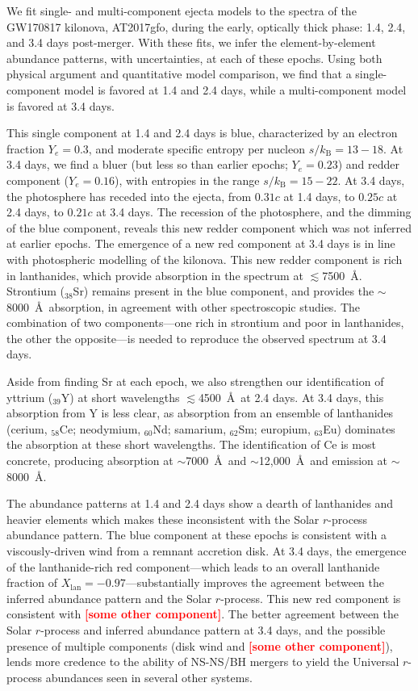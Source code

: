 \documentclass[twocolumn,twocolappendix]{aastex63}
\newcommand\redbf[1]{\textbf{\textcolor{red}{#1}}}
\begin{document}
We fit single- and multi-component ejecta models to the spectra of the GW170817 kilonova, AT2017gfo, during the early, optically thick phase: 1.4, 2.4, and 3.4 days post-merger. With these fits, we infer the element-by-element abundance patterns, with uncertainties, at each of these epochs. Using both physical argument and quantitative model comparison, we find that a single-component model is favored at 1.4 and 2.4 days, while a multi-component model is favored at 3.4 days. 

This single component at 1.4 and 2.4 days is blue, characterized by an electron fraction $Y_e = 0.3$, and moderate specific entropy per nucleon $s / k_{\mathrm{B}} = 13 - 18$. At 3.4 days, we find a bluer (but less so than earlier epochs; $Y_e = 0.23$) and redder component ($Y_e = 0.16$), with entropies in the range $s / k_{\mathrm{B}} = 15 - 22$. At 3.4 days, the photosphere has receded into the ejecta, from $0.31c$ at 1.4 days, to $0.25c$ at 2.4 days, to $0.21c$ at 3.4 days. The recession of the photosphere, and the dimming of the blue component, reveals this new redder component which was not inferred at earlier epochs. The emergence of a new red component at 3.4 days is in line with photospheric modelling of the kilonova. This new redder component is rich in lanthanides, which provide absorption in the spectrum at $\lesssim$7500~\AA. Strontium (${}_{38}$Sr) remains present in the blue component, and provides the $\sim$8000~\AA~absorption, in agreement with other spectroscopic studies. The combination of two components---one rich in strontium and poor in lanthanides, the other the opposite---is needed to reproduce the observed spectrum at 3.4 days.

Aside from finding Sr at each epoch, we also strengthen our identification of yttrium (${}_{39}$Y) at short wavelengths $\lesssim$4500~\AA~at 2.4 days. At 3.4 days, this absorption from Y is less clear, as absorption from an ensemble of lanthanides (cerium, ${}_{58}$Ce; neodymium, ${}_{60}$Nd; samarium, ${}_{62}$Sm; europium, ${}_{63}$Eu) dominates the absorption at these short wavelengths. The identification of Ce is most concrete, producing absorption at $\sim$7000~\AA~and $\sim$12,000~\AA~and emission at $\sim$8000~\AA.

The abundance patterns at 1.4 and 2.4 days show a dearth of lanthanides and heavier elements which makes these inconsistent with the Solar $r$-process abundance pattern. The blue component at these epochs is consistent with a viscously-driven wind from a remnant accretion disk. At 3.4 days, the emergence of the lanthanide-rich red component---which leads to an overall lanthanide fraction of $X_{\mathrm{lan}} = -0.97$---substantially improves the agreement between the inferred abundance pattern and the Solar $r$-process. This new red component is consistent with \redbf{[some other component]}. The better agreement between the Solar $r$-process and inferred abundance pattern at 3.4 days, and the possible presence of multiple components (disk wind and \redbf{[some other component]}), lends more credence to the ability of NS-NS/BH mergers to yield the Universal $r$-process abundances seen in several other systems.
\end{document}
